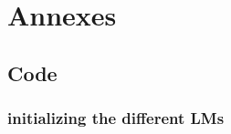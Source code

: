 \documentclass[a4paper,12pt]{article}
\begin{document}
\twocolumn


\clearpage


\onecolumn
\section{Annexes}

\subsection{Code}
\subsubsection{initializing the different LMs}
\end{document}
